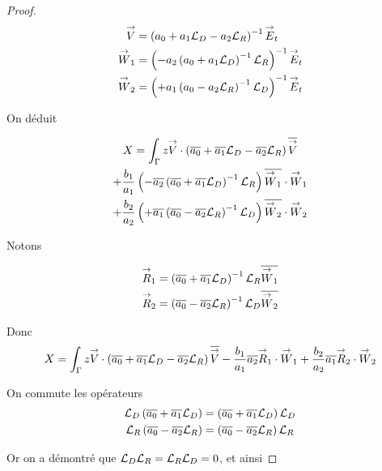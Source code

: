 \begin{proof}
    \begin{align*}
      {\overset{\rightarrow}{V}} & = \left(a_0  + a_1 {\mathcal{L}_D} - a_2{\mathcal{L}_R} \right)^{-1} {\overset{\rightarrow}{E}}_t
      \\
      {\overset{\rightarrow}{W}}_1 & = \left( - a_2 \left( a_0 + a_1{\mathcal{L}_D}\right)^{-1}{\mathcal{L}_R}\right)^{-1} {\overset{\rightarrow}{E}}_t
      \\
      {\overset{\rightarrow}{W}}_2 & = \left( + a_1 \left( a_0 - a_2{\mathcal{L}_R}\right)^{-1}{\mathcal{L}_D}\right)^{-1} {\overset{\rightarrow}{E}}_t
    \end{align*}

    On déduit

    \begin{multline*}
      X = \int_\Gamma z {\overset{\rightarrow}{V}} \cdot \left({\overline{a_0}}  + {\overline{a_1}} {\mathcal{L}_D} - {\overline{a_2}}{\mathcal{L}_R}\right){\overline{{\overset{\rightarrow}{V}}}}
      \\
      + \dfrac{b_1}{a_1} \left( - {\overline{a_2}} \left( {\overline{a_0}} + {\overline{a_1}}{\mathcal{L}_D}\right)^{-1}{\mathcal{L}_R}\right){\overline{{\overset{\rightarrow}{W}}_1}}\cdot{\overset{\rightarrow}{W}}_1
      \\
      + \dfrac{b_2}{a_2} \left( + {\overline{a_1}} \left( {\overline{a_0}} - {\overline{a_2}}{\mathcal{L}_R}\right)^{-1}{\mathcal{L}_D}\right){\overline{{\overset{\rightarrow}{W}}_2}}\cdot{\overset{\rightarrow}{W}}_2
    \end{multline*}

    Notons

    \newcommand{\vR}{\vect{R}}

    \begin{align*}
      \vR_1 & = \left(\conj{a_0}  + \conj{a_1} \LD \right)^{-1}\LR \conj{\vW_1}
      \\
      \vR_2 & = \left(\conj{a_0}  - \conj{a_2} \LR \right)^{-1}\LD \conj{\vW_2}
    \end{align*}

    Donc 
    \begin{equation*}
      X = \int_\Gamma z \vV \cdot \left(\conj{a_0}  + \conj{a_1} \LD - \conj{a_2}\LR\right)\conj{\vV} - \frac{b_1}{a_1}\conj{a_2}\vR_1\cdot\vW_1 + \frac{b_2}{a_2}\conj{a_1}\vR_2\cdot\vW_2
    \end{equation*}

    On commute les opérateurs
    \begin{align*}
      {\mathcal{L}_D}\left({\overline{a_0}}  + {\overline{a_1}} {\mathcal{L}_D} \right)&=\left({\overline{a_0}}  + {\overline{a_1}} {\mathcal{L}_D} \right){\mathcal{L}_D}
      \\
      {\mathcal{L}_R}\left({\overline{a_0}}  - {\overline{a_2}} {\mathcal{L}_R} \right)&=\left({\overline{a_0}}  - {\overline{a_2}} {\mathcal{L}_R} \right){\mathcal{L}_R}
    \end{align*}

    Or on a démontré que \({\mathcal{L}_D}{\mathcal{L}_R}={\mathcal{L}_R}{\mathcal{L}_D}=0\), et ainsi


\end{proof}
